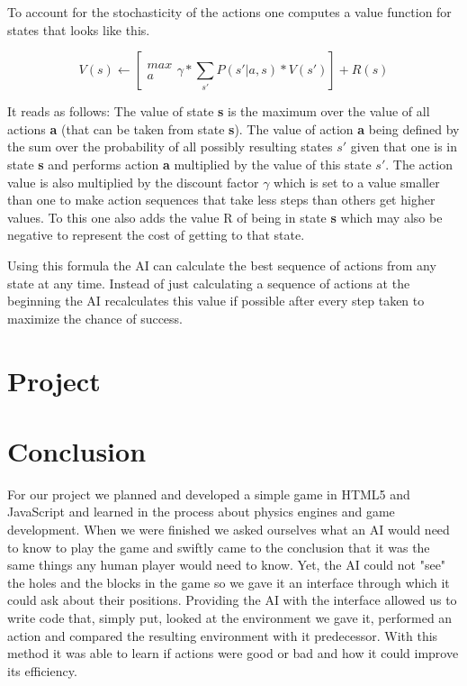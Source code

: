 To account for the stochasticity of the actions one computes a value function for states that looks like this.

\[V(s) \leftarrow \left [\begin{matrix} max \\ a \end{matrix} \gamma * \sum_{s'} P(s'|a,s)* V(s')  \right ]+R(s)\]

It reads as follows: The value of state {\bf s} is the maximum over the value of all actions {\bf a} (that can be taken from state {\bf s}). The value of action {\bf a} being defined by the sum over the probability of all possibly resulting states {\bf $s'$} given that one is in state {\bf s} and performs action {\bf a} multiplied by the value of this state {\bf $s'$}. The action value is also multiplied by the discount factor $\gamma$  which is set to a value smaller than one to make action sequences that take less steps than others get higher values. To this one also adds the value R of being in state {\bf s} which may also be negative to represent the cost of getting to that state.

Using this formula the AI can calculate the best sequence of actions from any state at any time. Instead of just calculating a sequence of actions at the beginning the AI recalculates this value if possible after every step taken to maximize the chance of success.

\chapter{Project}



\chapter{Conclusion}

For our project we planned and developed a simple game in HTML5 and JavaScript and learned in the process about physics engines and game development. When we were finished we asked ourselves what an AI would need to know to play the game and swiftly came to the conclusion that it was the same things any human player would need to know. Yet, the AI could not "see" the holes and the blocks in the game so we gave it an interface through which it could ask about their positions. Providing the AI with the interface allowed us to write code that, simply put, looked at the environment we gave it, performed an action and compared the resulting environment with it predecessor. With this method it was able to learn if actions were good or bad and how it could improve its efficiency.

